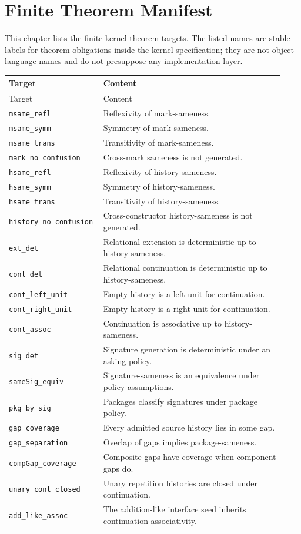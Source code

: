 \chapter{Finite Theorem Manifest}
\label{ch:core-finite-theorem-manifest}

This chapter lists the finite kernel theorem targets. The listed names are stable labels for theorem obligations inside the kernel specification; they are not object-language names and do not presuppose any implementation layer.

\begin{longtable}{p{0.29\linewidth}p{0.64\linewidth}}
\toprule
Target & Content \\
\midrule
\endfirsthead
\toprule
Target & Content \\
\midrule
\endhead
\texttt{msame\_refl} & Reflexivity of mark-sameness. \\
\texttt{msame\_symm} & Symmetry of mark-sameness. \\
\texttt{msame\_trans} & Transitivity of mark-sameness. \\
\texttt{mark\_no\_confusion} & Cross-mark sameness is not generated. \\
\texttt{hsame\_refl} & Reflexivity of history-sameness. \\
\texttt{hsame\_symm} & Symmetry of history-sameness. \\
\texttt{hsame\_trans} & Transitivity of history-sameness. \\
\texttt{history\_no\_confusion} & Cross-constructor history-sameness is not generated. \\
\texttt{ext\_det} & Relational extension is deterministic up to history-sameness. \\
\texttt{cont\_det} & Relational continuation is deterministic up to history-sameness. \\
\texttt{cont\_left\_unit} & Empty history is a left unit for continuation. \\
\texttt{cont\_right\_unit} & Empty history is a right unit for continuation. \\
\texttt{cont\_assoc} & Continuation is associative up to history-sameness. \\
\texttt{sig\_det} & Signature generation is deterministic under an asking policy. \\
\texttt{sameSig\_equiv} & Signature-sameness is an equivalence under policy assumptions. \\
\texttt{pkg\_by\_sig} & Packages classify signatures under package policy. \\
\texttt{gap\_coverage} & Every admitted source history lies in some gap. \\
\texttt{gap\_separation} & Overlap of gaps implies package-sameness. \\
\texttt{compGap\_coverage} & Composite gaps have coverage when component gaps do. \\
\texttt{unary\_cont\_closed} & Unary repetition histories are closed under continuation. \\
\texttt{add\_like\_assoc} & The addition-like interface seed inherits continuation associativity. \\
\bottomrule
\end{longtable}
